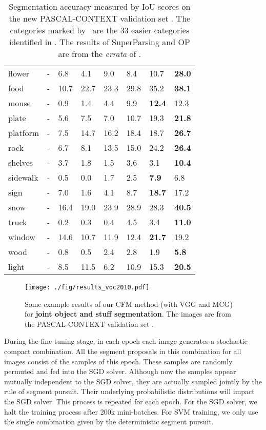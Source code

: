 \documentclass[10pt,twocolumn,letterpaper]{article}
\begin{document}
\begin{table}
\begin{center}
{\begin{tabular}{|x|xx|xxx|x|x|}
	flower&-&6.8&4.1&{9.0}&8.4&{10.7}&\textbf{28.0}\\
	food&-&10.7&22.7&23.3&{29.8}&35.2&\textbf{38.1}\\
	mouse&-&0.9&1.4&4.4&{9.9}&\textbf{12.4}&12.3\\
	plate&-&5.6&7.5&7.0&{10.7}&19.3&\textbf{21.8}\\
	platform&-&7.5&14.7&16.2&{18.4}&18.7&\textbf{26.7}\\
	rock&-&6.7&8.1&13.5&{15.0}&24.2&\textbf{26.4}\\
	shelves&-&{3.7}&1.8&1.5&3.6&{3.1}&\textbf{10.4}\\
	sidewalk&-&0.5&0.0&1.7&{2.5}&{\textbf{7.9}}&6.8\\
	sign&-&7.0&1.6&4.1&{8.7}&\textbf{18.7}&17.2\\
	snow&-&16.4&19.0&23.9&{28.9}&{28.3}&\textbf{40.5}\\
	truck&-&0.2&0.3&0.4&{4.5}&{3.4}&\textbf{11.0}\\
	window&-&{14.6}&10.7&11.9&12.4&{\textbf{21.7}}&19.2\\
	wood&-&0.8&0.5&2.4&2.8&{1.9}&\textbf{5.8}\\
	light&-&8.5&{11.5}&6.2&10.9&{15.3}&\textbf{20.5}\\
	\hline
\end{tabular}}
\end{center}
\caption{Segmentation accuracy measured by IoU scores on the new PASCAL-CONTEXT validation set \cite{mottaghi2014role}. The categories marked by \dag~are the 33 easier categories identified in \cite{mottaghi2014role}. The results of SuperParsing \cite{tighe2010superparsing} and OP \cite{carreira2012semantic} are from the \emph{errata} of \cite{mottaghi2014role}.}
\label{tab:voc2010_approaches}
\end{table}

\begin{figure*}[t]
  \centering
  \texttt{[image: ./fig/results\_voc2010.pdf]}
  \caption{Some example results of our CFM method (with VGG and MCG) for \textbf{joint object and stuff segmentation}. The images are from the PASCAL-CONTEXT validation set \cite{mottaghi2014role}.}
  \label{fig:segmentation_examples}
\end{figure*}

During the fine-tuning stage, in each epoch each image generates a stochastic compact combination. All the segment proposals in this combination for all images consist of the samples of this epoch. These samples are randomly permuted and fed into the SGD solver. Although now the samples appear mutually independent to the SGD solver, they are actually sampled jointly by the rule of segment pursuit. Their underlying probabilistic distributions will impact the SGD solver. This process is repeated for each epoch. For the SGD solver, we halt the training process after 200k mini-batches. For SVM training, we only use the single combination given by the deterministic segment pursuit.
\end{document}
